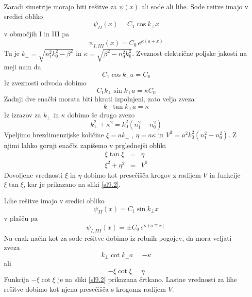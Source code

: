 Zaradi simetrije morajo biti rešitve za $\psi\left(x\right)$ ali
sode ali lihe. Sode re\textquotedbl{}itve imajo v sredici obliko 
\begin{equation}
\psi_{II}(x)=C_{1}\cos k_{\perp}x\label{9.4}
\end{equation}
 v območjih I in III pa 
\begin{equation}
\psi_{I,III}\left(x\right)=C_{0}\, e^{\kappa\left(a\mp x\right)}\label{9.41}
\end{equation}
 Tu je $k_{\perp}=\sqrt{n_{1}^{2}k_{0}^{2}-\beta^{2}}$ in $\kappa=\sqrt{\beta^{2}-n_{0}^{2}k_{0}^{2}}$.
Zveznost električne poljske jakosti na meji nam da 
\begin{equation}
C_{1}\cos k_{\perp}a=C_{0}\label{9.5}
\end{equation}
 Iz zveznosti odvoda dobimo 
\begin{equation}
C_{1}k_{\perp}\sin k_{\perp}a=\kappa C_{0}\label{9.6}
\end{equation}
 Zadnji dve enačbi morata biti hkrati izpolnjeni, zato velja zveza
\begin{equation}
k_{\perp}\tan k_{\perp}a=\kappa\label{9.7}
\end{equation}
 Iz izrazov za $k_{\perp}$ in $\kappa$ dobimo še drugo zvezo 
\begin{equation}
k_{\perp}^{2}+\kappa^{2}=k_{0}^{2}\left(n_{1}^{2}-n_{0}^{2}\right)\label{9.8}
\end{equation}
 Vpeljimo brezdimenzijske količine $\xi=ak_{\perp}$ , $\eta=a\kappa$
in $V^{2}=a^{2}k_{0}^{2}\left(n_{1}^{2}-n_{0}^{2}\right)$. Z njimi
lahko gornji enačbi zapišemo v prglednejši obliki 
\begin{eqnarray}
\xi\tan\xi & = & \eta\label{9.9}\\
\xi^{2}+\eta^{2} & = & V^{2}
\end{eqnarray}
 Dovoljene vrednosti $\xi$ in $\eta$ dobimo kot presečišča krogov
z radijem $V$ in funkcije $\xi\tan\xi$, kar je prikazano na sliki
\ref{sl9.2}.

Lihe rešitve imajo v sredici obliko 
\begin{equation}
\psi_{II}(x)=C_{1}\sin k_{\perp}x\label{9.11}
\end{equation}
 v plašču pa 
\begin{equation}
\psi_{I,III}\left(x\right)=\pm C_{0}\, e^{\kappa\left(a\mp x\right)}\label{9.12}
\end{equation}
 Na enak način kot za sode rešitve dobimo iz robnih pogojev, da mora
veljati zveza 
\begin{equation}
k_{\perp}\cot k_{\perp}a=-\kappa\label{9.13}
\end{equation}
 ali 
\begin{equation}
-\xi\cot\xi=\eta\label{9.14}
\end{equation}
 Funkcija $-\xi\cot\xi$ je na sliki \ref{sl9.2} prikazana črtkano.
Lastne vrednosti za lihe rešitve dobimo kot njena presečišča s krogomz
radijem $V$.

